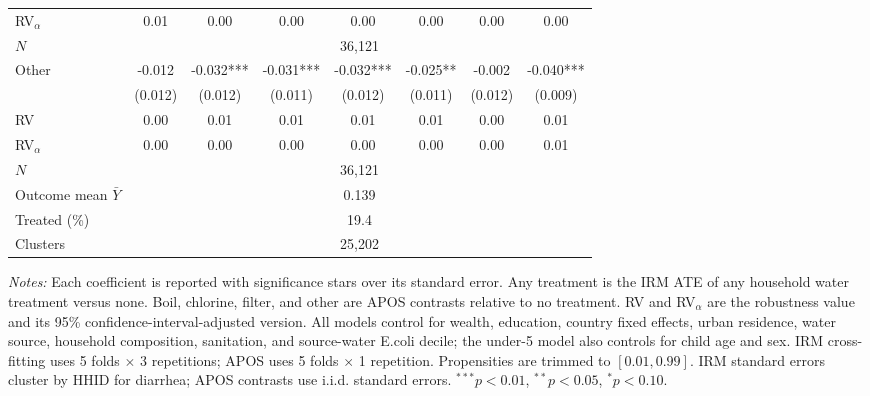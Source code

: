 \begin{table}[htbp]
\begin{adjustbox}{max width=\linewidth, max totalheight=0.86\textheight, center}
\begin{tabular}{l|ccccccc}
\quad RV$_\alpha$ & 0.01 & 0.00 & 0.00 & 0.00 & 0.00 & 0.00 & 0.00 \\
\quad $N$ & \multicolumn{7}{c}{36,121} \\
\midrule
Other & -0.012 & -0.032*** & -0.031*** & -0.032*** & -0.025** & -0.002 & -0.040*** \\
 & (0.012) & (0.012) & (0.011) & (0.012) & (0.011) & (0.012) & (0.009) \\
\quad RV & 0.00 & 0.01 & 0.01 & 0.01 & 0.01 & 0.00 & 0.01 \\
\quad RV$_\alpha$ & 0.00 & 0.00 & 0.00 & 0.00 & 0.00 & 0.00 & 0.01 \\
\quad $N$ & \multicolumn{7}{c}{36,121} \\
\midrule
Outcome mean $\bar Y$ & \multicolumn{7}{c}{0.139} \\
Treated (\%) & \multicolumn{7}{c}{19.4} \\
Clusters & \multicolumn{7}{c}{25,202} \\
\bottomrule
\end{tabular}
\end{adjustbox}
\par\vspace{3pt}
\begin{minipage}{\linewidth}\scriptsize \textit{Notes:} Each coefficient is reported with significance stars over its standard error. Any treatment is the IRM ATE of any household water treatment versus none. Boil, chlorine, filter, and other are APOS contrasts relative to no treatment. RV and RV$_\alpha$ are the robustness value and its 95\% confidence-interval-adjusted version. All models control for wealth, education, country fixed effects, urban residence, water source, household composition, sanitation, and source-water E.coli decile; the under-5 model also controls for child age and sex. IRM cross-fitting uses 5 folds $\times$ 3 repetitions; APOS uses 5 folds $\times$ 1 repetition. Propensities are trimmed to $[0.01,0.99]$. IRM standard errors cluster by HHID for diarrhea; APOS contrasts use i.i.d. standard errors. $^{***}p<0.01$, $^{**}p<0.05$, $^{*}p<0.10$.\end{minipage}
\end{table}
